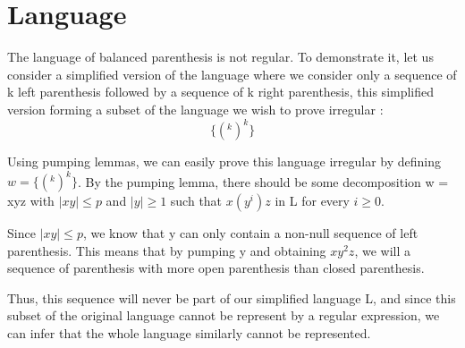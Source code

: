 \documentclass[a4paper, 11pt]{article}
\begin{document}
    \section{Language}
    	The language of balanced parenthesis is not regular.
    	To demonstrate it, let us consider a simplified version of the language
    	where we consider only a sequence of k left parenthesis followed by
    	a sequence of k right parenthesis, this simplified version forming
    	a subset of the language we wish to prove irregular :
    	\newline
    	$$\{(^k )^k\}$$

    	Using pumping lemmas, we can easily prove this language irregular by defining
    	$w = \{(^k )^k\}$. By the pumping lemma, there should be some decomposition
    	w = xyz with $|xy| \le p$ and $|y| \ge 1$ such that $x(y^i)z$
    	in L for every $i \ge 0$. \newline

    	Since $|xy| \le p$, we know that y can only contain a non-null sequence of
    	left parenthesis. This means that by pumping y and obtaining $xy^2 z$, we will
    	a sequence of parenthesis with more open parenthesis than closed parenthesis.
    	\newline

    	Thus, this sequence will never be part of our simplified language L, and since
    	this subset of the original language cannot be represent by a regular expression,
    	we can infer that the whole language similarly cannot be represented.
\end{document}
